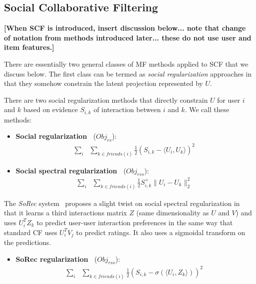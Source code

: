 \documentclass{sig-alternate}
\newcommand{\Obj}{\mathit{Obj}}
\newcommand{\rs}{\mathit{rs}}
\newcommand{\rss}{\mathit{rss}}
\newcommand{\la}{\langle}
\newcommand{\ra}{\rangle}
\begin{document}
\label{sec:Background}

\subsection{Social Collaborative Filtering}

{\bf [When SCF is introduced, insert discussion below... note that change
of notation from methods introduced later... these do not use user and item
features.]}


There are essentially two general classes of MF methods applied to SCF that we discuss
below.  The first class can be termed as \emph{social regularization}
approaches in that they somehow constrain the latent projection
represented by $U$.  

There are two social regularization methods that directly constrain $U$ for user $i$
and $k$ based on evidence $S_{i,k}$ of interaction between $i$ and $k$.  We call
these methods:

\begin{itemize}
\item {\bf Social regularization~\cite{lla,socinf}} ($\Obj_\rs$):
\begin{align}
\sum_{i} & \sum_{k \in \mathit{friends}(i)} \frac{1}{2} (S_{i,k} - \la U_i, U_k \ra)^2 \nonumber 
\end{align}

\item {\bf Social spectral regularization~\cite{sr,rrmf}} ($\Obj_\rss$):
\begin{align}
\sum_{i} & \sum_{k \in \mathit{friends}(i)} \frac{1}{2} S^+_{i,k} \| U_i - U_k \|_2^2 \nonumber
\end{align}
\end{itemize}

The {\it SoRec} system~\cite{sorec} proposes a slight twist on social spectral regularization in that it learns
a third interactions matrix $Z$ (same dimensionality as $U$ and $V$) and uses $U_i^T Z_k$ to predict user-user
interaction preferences in the same way that standard CF uses $U_i^T V_j$ to predict ratings.  It also
uses a sigmoidal transform on the predictions.

\begin{itemize}
\item {\bf SoRec regularization~\cite{sorec}} ($\Obj_\rss$):
\begin{align}
\sum_{i} & \sum_{k \in \mathit{friends}(i)} \frac{1}{2} (S_{i,k} - \sigma(\la U_i, Z_k \ra))^2 \nonumber
\end{align}
\end{itemize}
\end{document}

